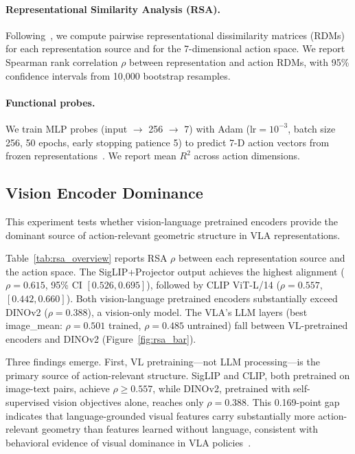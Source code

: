 \paragraph{Representational Similarity Analysis (RSA).}
Following~\cite{kriegeskorte2008}, we compute pairwise representational dissimilarity matrices (RDMs) for each representation source and for the 7-dimensional action space.
We report Spearman rank correlation $\rho$ between representation and action RDMs, with 95\% confidence intervals from 10{,}000 bootstrap resamples.

\paragraph{Functional probes.}
We train MLP probes (input $\to$ 256 $\to$ 7) with Adam (lr${}=10^{-3}$, batch size 256, 50 epochs, early stopping patience 5) to predict 7-D action vectors from frozen representations~\cite{alain2017}. We report mean $R^2$ across action dimensions.

\subsection{Vision Encoder Dominance}
\label{sec:vision_dominance}

This experiment tests whether vision-language pretrained encoders provide the dominant source of action-relevant geometric structure in VLA representations.

Table~\ref{tab:rsa_overview} reports RSA $\rho$ between each representation source and the action space.
The SigLIP+Projector output achieves the highest alignment ($\rho = 0.615$, 95\% CI $[0.526, 0.695]$), followed by CLIP ViT-L/14 ($\rho = 0.557$, $[0.442, 0.660]$).
Both vision-language pretrained encoders substantially exceed DINOv2 ($\rho = 0.388$), a vision-only model.
The VLA's LLM layers (best image\_mean: $\rho = 0.501$ trained, $\rho = 0.485$ untrained) fall between VL-pretrained encoders and DINOv2 (Figure~\ref{fig:rsa_bar}).

Three findings emerge.
First, VL pretraining---not LLM processing---is the primary source of action-relevant structure.
SigLIP and CLIP, both pretrained on image-text pairs, achieve $\rho \geq 0.557$, while DINOv2, pretrained with self-supervised vision objectives alone, reaches only $\rho = 0.388$.
This 0.169-point gap indicates that language-grounded visual features carry substantially more action-relevant geometry than features learned without language, consistent with behavioral evidence of visual dominance in VLA policies~\cite{grant2026}.

